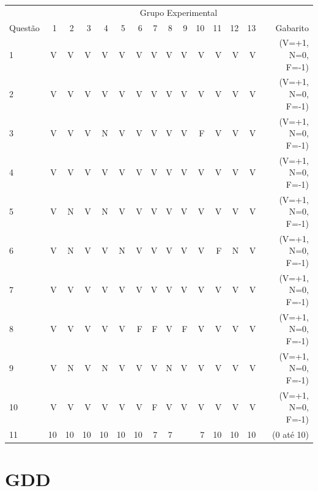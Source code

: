 \begin{apendicesenv}
\begin{center}
	\begin{tabular}{ l r r r r r r r r r r r r r r}
	\hline
	& \multicolumn{14}{c}{Grupo Experimental}\\
	\cline{2 - 14} %
	\multirow[c]{-2}{*}{Questão} & 1 & 2 & 3 & 4 & 5 & 6 & 7 & 8 & 9 & 10 & 11 & 12 & 13 & Gabarito\\
	\hline
	1	&	V	&	V	&	V	&	V	&	V	&	V	&	V	&	V	&	V	&	V	&	V	&	V	&	V	&	(V=+1, N=0, F=-1)	\\
	2	&	V	&	V	&	V	&	V	&	V	&	V	&	V	&	V	&	V	&	V	&	V	&	V	&	V	&	(V=+1, N=0, F=-1)	\\
	3	&	V	&	V	&	V	&	N	&	V	&	V	&	V	&	V	&	V	&	F	&	V	&	V	&	V	&	(V=+1, N=0, F=-1)	\\
	4	&	V	&	V	&	V	&	V	&	V	&	V	&	V	&	V	&	V	&	V	&	V	&	V	&	V	&	(V=+1, N=0, F=-1)	\\
	5	&	V	&	N	&	V	&	N	&	V	&	V	&	V	&	V	&	V	&	V	&	V	&	V	&	V	&	(V=+1, N=0, F=-1)	\\
	6	&	V	&	N	&	V	&	V	&	N	&	V	&	V	&	V	&	V	&	V	&	F	&	N	&	V	&	(V=+1, N=0, F=-1)	\\
	7	&	V	&	V	&	V	&	V	&	V	&	V	&	V	&	V	&	V	&	V	&	V	&	V	&	V	&	(V=+1, N=0, F=-1)	\\
	8	&	V	&	V	&	V	&	V	&	V	&	F	&	F	&	V	&	F	&	V	&	V	&	V	&	V	&	(V=+1, N=0, F=-1)	\\
	9	&	V	&	N	&	V	&	N	&	V	&	V	&	V	&	N	&	V	&	V	&	V	&	V	&	V	&	(V=+1, N=0, F=-1)	\\
	10	&	V	&	V	&	V	&	V	&	V	&	V	&	F	&	V	&	V	&	V	&	V	&	V	&	V	&	(V=+1, N=0, F=-1)	\\
	11	&	10	&	10	&	10	&	10	&	10	&	10	&	7	&	7	&		&	7	&	10	&	10	&	10	&	(0 até 10)	\\
	\hline
	\bottomrule
	\end{tabular}
\end{center}


\chapter{GDD}\label{chap:GDD}


\end{apendicesenv}
